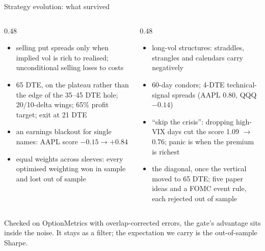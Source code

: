 \documentclass[aspectratio=169,10pt]{beamer}
\newcommand{\muted}[1]{{\color{muted}#1}}
\begin{document}
\begin{frame}{Strategy evolution: what survived}
  \begin{columns}[T]
    \begin{column}{0.48\textwidth}
      \begin{itemize}
        \item selling put spreads only when implied vol is rich to realised; unconditional selling loses to costs
        \item 65 DTE, on the plateau rather than the edge of the 35--45 DTE hole; 20/10-delta wings; 65\% profit
              target; exit at 21 DTE
        \item an earnings blackout for single names: AAPL score $-0.15 \to +0.84$
        \item equal weights across sleeves: every optimised weighting won in sample and lost out of sample
      \end{itemize}
    \end{column}
    \begin{column}{0.48\textwidth}
      \begin{itemize}
        \item long-vol structures: straddles, strangles and calendars carry negatively
        \item 60-day condors; 4-DTE technical-signal spreads (AAPL 0.80, QQQ $-0.14$)
        \item ``skip the crisis'': dropping high-VIX days cut the score 1.09 $\to$ 0.76; panic is when the premium
              is richest
        \item the diagonal, once the vertical moved to 65 DTE; five paper ideas and a FOMC event rule, each
              rejected out of sample
      \end{itemize}
    \end{column}
  \end{columns}
  \vspace{0.7em}
  \muted{Checked on OptionMetrics with overlap-corrected errors, the gate's advantage sits inside the noise. It stays
  as a filter; the expectation we carry is the out-of-sample Sharpe.}
\end{frame}
\end{document}
